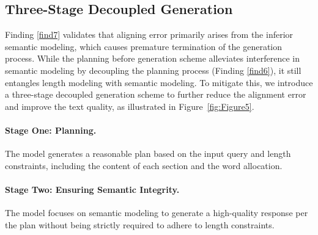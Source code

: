\vspace{-5pt}
\subsection{Three-Stage Decoupled Generation}
\label{sec:Two-Stage High-Quality Text Generation}
Finding \ref{find7} validates that aligning error primarily arises from the inferior semantic modeling, which causes premature termination of the generation process.
%
While the planning before generation scheme alleviates interference in semantic modeling by decoupling the planning process (Finding \ref{find6}), it still entangles length modeling with semantic modeling.
To mitigate this, we introduce a three-stage decoupled generation scheme to further reduce the alignment error and improve the text quality, as illustrated in Figure~\ref{fig:Figure5}.
\paragraph{Stage One: Planning.} The model generates a reasonable plan based on the input query and length constraints, including the content of each section and the word allocation.
\paragraph{Stage Two: Ensuring Semantic Integrity.} The model focuses on semantic modeling to generate a high-quality response per the plan without being strictly required to adhere to length constraints.
